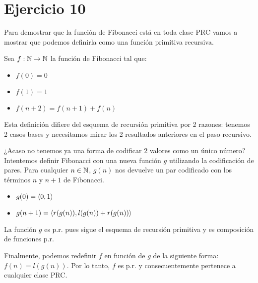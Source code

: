 \section*{Ejercicio 10}

Para demostrar que la función de Fibonacci está en toda clase PRC vamos a mostrar que podemos definirla como una función primitiva recursiva.

Sea $f: \mathbb{N} \to \mathbb{N}$ la función de Fibonacci tal que:

\begin{itemize}
    \item $f(0) = 0$
    \item $f(1) = 1$
    \item $f(n + 2) = f(n + 1) + f(n)$
\end{itemize}

Esta definición difiere del esquema de recursión primitiva por 2 razones: tenemos 2 casos bases y necesitamos mirar los 2 resultados anteriores en el paso recursivo.

¿Acaso no tenemos ya una forma de codificar 2 valores como un único número? Intentemos definir Fibonacci con una nueva función $g$ utilizando la codificación de pares. Para cualquier $n \in \mathbb{N}$, $g(n)$ nos devuelve un par codificado con los términos $n$ y $n+1$ de Fibonacci.

\begin{itemize}
    \item $g(0) = \langle 0, 1 \rangle$
    \item $g(n + 1) = \langle r(g(n)), l(g(n)) + r(g(n)) \rangle$
\end{itemize}

La función $g$ es p.r. pues sigue el esquema de recursión primitiva y es composición de funciones p.r.

Finalmente, podemos redefinir $f$ en función de $g$ de la siguiente forma: $f(n) = l(g(n))$. Por lo tanto, $f$ es p.r. y consecuentemente pertenece a cualquier clase PRC.
